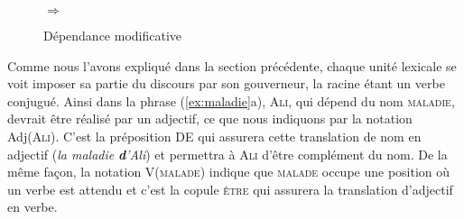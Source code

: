 \begin{figure}
\begin{floatrow}
\ffigbox
  {\caption{Dépendance modificative}\label{fig:dep-mod}}
  {%
\begin{minipage}[c]{.15\textwidth}\centering%
\end{minipage}
\begin{minipage}[c]{.1\textwidth}\centering\huge$\Rightarrow$\end{minipage}
\begin{minipage}[c]{.15\textwidth}\centering%
\end{minipage}}
\end{floatrow}
\end{figure}

Comme nous l’avons expliqué dans la section précédente, chaque unité lexicale se voit imposer sa partie du discours par son gouverneur, la racine étant un verbe conjugué. Ainsi dans la phrase (\ref{ex:maladie}a), \textsc{Ali}, qui dépend du nom \textsc{maladie}, devrait être réalisé par un adjectif, ce que nous indiquons par la notation Adj(\textsc{Ali}). C’est la préposition DE qui assurera cette translation de nom en adjectif (\textit{la maladie} \textbf{\textit{d}}\textit{’Ali}) et permettra à \textsc{Ali} d’être complément du nom. De la même façon, la notation V(\textsc{malade}) indique que \textsc{malade} occupe une position où un verbe est attendu et c’est la copule \textsc{être} qui assurera la translation d’adjectif en verbe.\largerpage

